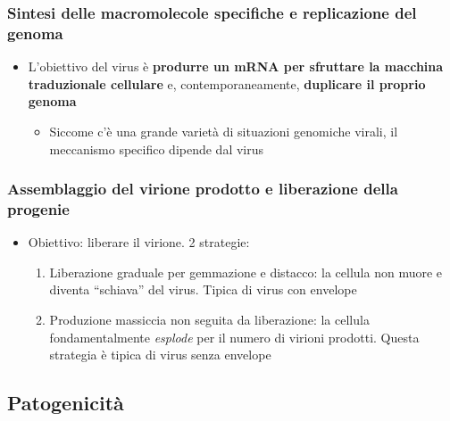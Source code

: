 \documentclass[italian,]{article}
\providecommand{\tightlist}{%
  \setlength{\itemsep}{0pt}\setlength{\parskip}{0pt}}
\begin{document}
\hypertarget{sintesi-delle-macromolecole-specifiche-e-replicazione-del-genoma}{%
\subsubsection{Sintesi delle macromolecole specifiche e replicazione del
genoma}\label{sintesi-delle-macromolecole-specifiche-e-replicazione-del-genoma}}

\begin{itemize}
\tightlist
\item
  L'obiettivo del virus è \textbf{produrre un mRNA per sfruttare la
  macchina traduzionale cellulare} e, contemporaneamente,
  \textbf{duplicare il proprio genoma}

  \begin{itemize}
  \tightlist
  \item
    Siccome c'è una grande varietà di situazioni genomiche virali, il
    meccanismo specifico dipende dal virus
  \end{itemize}
\end{itemize}

\hypertarget{assemblaggio-del-virione-prodotto-e-liberazione-della-progenie}{%
\subsubsection{Assemblaggio del virione prodotto e liberazione della
progenie}\label{assemblaggio-del-virione-prodotto-e-liberazione-della-progenie}}

\begin{itemize}
\tightlist
\item
  Obiettivo: liberare il virione. 2 strategie:

  \begin{enumerate}
  \def\labelenumi{\arabic{enumi}.}
  \tightlist
  \item
    Liberazione graduale per gemmazione e distacco: la cellula non muore
    e diventa ``schiava'' del virus. Tipica di virus con envelope
  \item
    Produzione massiccia non seguita da liberazione: la cellula
    fondamentalmente \emph{esplode} per il numero di virioni prodotti.
    Questa strategia è tipica di virus senza envelope
  \end{enumerate}
\end{itemize}

\hypertarget{patogenicituxe0}{%
\subsection{Patogenicità}\label{patogenicituxe0}}
\end{document}
